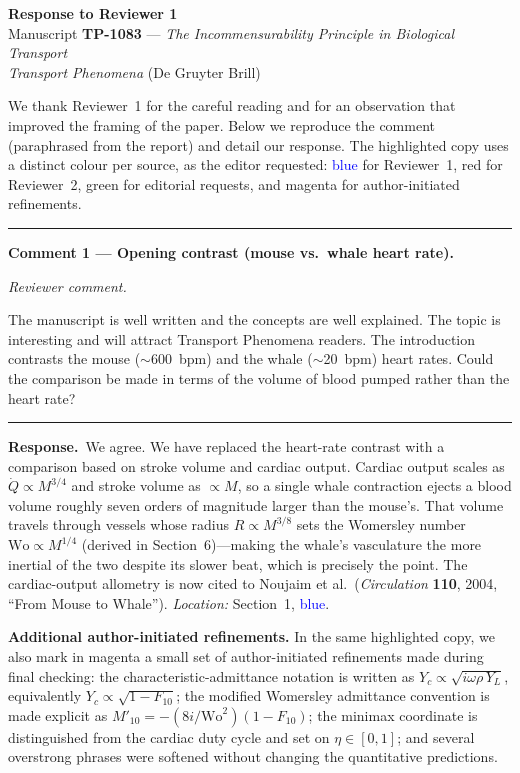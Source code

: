 \documentclass[11pt]{article}
\newcommand{\rone}[1]{\textcolor{blue}{#1}}
\newenvironment{comment}%
  {\par\medskip\noindent\itshape\color{black!75} Reviewer comment.\par\nobreak}%
  {\par\nobreak\noindent\rule{\linewidth}{0.4pt}\medskip}
\newcommand{\response}{\par\medskip\noindent\textbf{Response.}\ }
\begin{document}
\begin{center}
{\large\bfseries Response to Reviewer 1}\\[4pt]
Manuscript \textbf{TP-1083} --- \emph{The Incommensurability Principle in
Biological Transport}\\
\emph{Transport Phenomena} (De Gruyter Brill)
\end{center}

\bigskip
\noindent We thank Reviewer~1 for the careful reading and for an observation that
improved the framing of the paper. Below we reproduce the comment (paraphrased
from the report) and detail our response. The highlighted copy uses a distinct
colour per source, as the editor requested: \rone{blue} for Reviewer~1, red for
Reviewer~2, green for editorial requests, and magenta for author-initiated
refinements.

\bigskip
\hrule
\bigskip

\noindent\textbf{Comment 1 --- Opening contrast (mouse vs.\ whale heart rate).}
\begin{comment}
The manuscript is well written and the concepts are well explained. The topic
is interesting and will attract Transport Phenomena readers. The introduction
contrasts the mouse ($\sim$600~bpm) and the whale ($\sim$20~bpm) heart rates.
Could the comparison be made in terms of the volume of blood pumped rather than
the heart rate?
\end{comment}

\response We agree. We have replaced the heart-rate contrast with a comparison
based on stroke volume and cardiac output. Cardiac output scales as
$\dot{Q}\propto M^{3/4}$ and stroke volume as $\propto M$, so a single whale
contraction ejects a blood volume roughly seven orders of magnitude larger than
the mouse's. That volume
travels through vessels whose radius $R\propto M^{3/8}$ sets the Womersley
number $\mathrm{Wo}\propto M^{1/4}$ (derived in Section~6)---making the whale's
vasculature the more inertial of the two despite its slower beat, which is
precisely the point. The cardiac-output allometry is now cited to Noujaim et
al.\ (\emph{Circulation} \textbf{110}, 2004, ``From Mouse to Whale'').
\emph{Location:} Section~1, \rone{blue}.


\bigskip
\noindent\textbf{Additional author-initiated refinements.} In the same highlighted copy,
we also mark in magenta a small set of author-initiated refinements made during
final checking: the characteristic-admittance notation is written as
$Y_c\propto\sqrt{i\omega\rho\,Y_L}$, equivalently
$Y_c\propto\sqrt{1-F_{10}}$; the modified Womersley admittance convention is
made explicit as $M'_{10}=-(8i/\mathrm{Wo}^2)(1-F_{10})$; the minimax coordinate
is distinguished from the cardiac duty cycle and set on $\eta\in[0,1]$; and
several overstrong phrases were softened without changing the quantitative
predictions.
\end{document}
